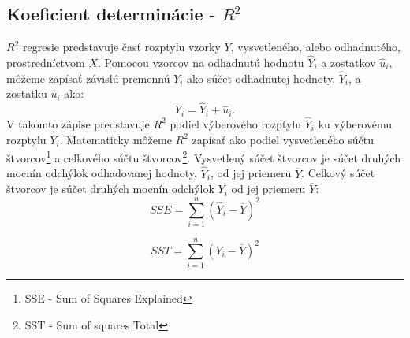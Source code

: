 \documentclass[]{tukediphc}
\begin{document}
\subsection{Koeficient determinácie - $R^2$}

$R^2$ regresie predstavuje časť rozptylu vzorky $Y$, vysvetleného, alebo odhadnutého, prostredníctvom $X$. Pomocou vzorcov na odhadnutú hodnotu $\hat{Y}_{i}$ a zostatkov $\hat{u}_{i}$, môžeme zapísať závislú premennú $Y_i$ ako súčet odhadnutej hodnoty, $\hat{Y}_{i}$, a zostatku $\hat{u}_{i}$ ako: 
\begin{equation}
   {Y}_{i} = \hat{Y}_{i} + \hat{u}_{i}.
\end{equation}
V takomto zápise predstavuje $R^2$ podiel výberového rozptylu $\hat{Y}_{i}$ ku výberovému rozptylu $Y_i$.  
Matematicky môžeme $R^2$ zapísať ako podiel vysvetleného súčtu štvorcov\footnote{SSE - Sum of Squares Explained} a celkového súčtu štvorcov\footnote{SST - Sum of squares Total}. Vysvetlený súčet štvorcov je súčet druhých mocnín odchýlok odhadovanej hodnoty, $\hat{Y}_{i}$, od jej priemeru $\overline{Y}$. Celkový súčet štvorcov je súčet druhých mocnín odchýlok $Y_i$ od jej priemeru $\overline{Y}$: 
\begin{equation}
    SSE = \sum_{i=1}^{n}(\hat{Y}_{i} - \overline{Y})^2
\end{equation}

\begin{equation}
    SST = \sum_{i=1}^{n}({Y}_{i} - \overline{Y})^2
\end{equation}
\end{document}
